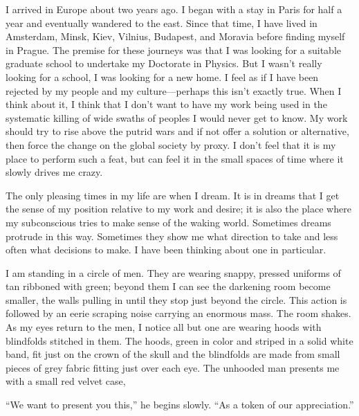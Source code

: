 I arrived in Europe about two years ago. I began with a stay in Paris
for half a year and eventually wandered to the east. Since that time, I
have lived in Amsterdam, Minsk, Kiev, Vilnius, Budapest, and Moravia
before finding myself in Prague. The premise for these journeys was that
I was looking for a suitable graduate school to undertake my Doctorate
in Physics. But I wasn't really looking for a school, I was looking for
a new home. I feel as if I have been rejected by my people and my
culture---perhaps this isn't exactly true. When I think about it, I
think that I don't want to have my work being used in the systematic
killing of wide swaths of peoples I would never get to know. My work
should try to rise above the putrid wars and if not offer a solution or
alternative, then force the change on the global society by proxy. I
don't feel that it is my place to perform such a feat, but can feel it
in the small spaces of time where it slowly drives me crazy.

The only pleasing times in my life are when I dream. It is in dreams
that I get the sense of my position relative to my work and desire; it
is also the place where my subconscious tries to make sense of the
waking world. Sometimes dreams protrude in this way. Sometimes they show
me what direction to take and less often what decisions to make. I have
been thinking about one in particular.

I am standing in a circle of men. They are wearing snappy, pressed
uniforms of tan ribboned with green; beyond them I can see the darkening
room become smaller, the walls pulling in until they stop just beyond
the circle. This action is followed by an eerie scraping noise carrying
an enormous mass. The room shakes. As my eyes return to the men, I
notice all but one are wearing hoods with blindfolds stitched in them.
The hoods, green in color and striped in a solid white band, fit just on
the crown of the skull and the blindfolds are made from small pieces of
grey fabric fitting just over each eye. The unhooded man presents me
with a small red velvet case,

``We want to present you this,'' he begins slowly. ``As a token of our
appreciation.''

